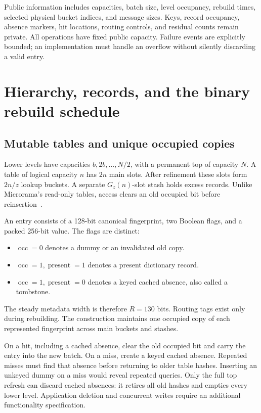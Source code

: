 \documentclass[11pt]{article}
\newcommand{\occ}{\operatorname{occ}}
\newcommand{\pres}{\operatorname{present}}
\begin{document}
Public information includes capacities, batch size, level occupancy,
rebuild times, selected physical bucket indices, and message sizes. Keys,
record occupancy, absence markers, hit locations, routing controls, and
residual counts remain private. All operations have fixed public capacity.
Failure events are explicitly bounded; an implementation must handle an
overflow without silently discarding a valid entry.

\section{Hierarchy, records, and the binary rebuild schedule}
\subsection{Mutable tables and unique occupied copies}
Lower levels have capacities $b,2b,\ldots,N/2$, with a permanent top of
capacity $N$. A table of logical capacity $n$ has $2n$ main slots. After
refinement these slots form $2n/z$ lookup buckets. A separate $G_z(n)$-slot
stash holds excess records. Unlike Microrama's read-only tables, access
clears an old occupied bit before reinsertion~\cite{microrama}.

An entry consists of a 128-bit canonical fingerprint, two Boolean flags,
and a packed 256-bit value. The flags are distinct:
\begin{itemize}
\item $\occ=0$ denotes a dummy or an invalidated old copy.
\item $\occ=1,\pres=1$ denotes a present dictionary record.
\item $\occ=1,\pres=0$ denotes a keyed cached absence, also called a tombstone.
\end{itemize}
The steady metadata width is therefore $R=130$ bits. Routing tags exist
only during rebuilding. The construction maintains one occupied copy of
each represented fingerprint across main buckets and stashes.

On a hit, including a cached absence, clear the old occupied bit and carry
the entry into the new batch. On a miss, create a keyed cached absence.
Repeated misses must find that absence before returning to older table
hashes. Inserting an unkeyed dummy on a miss would reveal repeated queries.
Only the full top refresh can discard cached absences: it retires all old
hashes and empties every lower level. Application deletion and concurrent
writes require an additional functionality specification.
\end{document}
